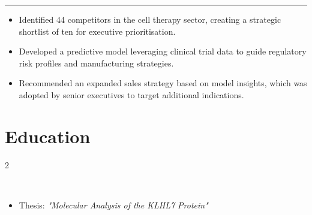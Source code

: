 \documentclass[a4paper]{deedy-resume} %
\begin{document}
\begin{center} 
    \vspace{-17pt}
     \rule{0.98\linewidth}{0.5pt} 
     \vspace{-11pt} 
\end{center} 
\begin{itemize} 
    \item Identified 44 competitors in the cell therapy sector, creating a strategic shortlist of ten for executive prioritisation. 
    \item Developed a predictive model leveraging clinical trial data to guide regulatory risk profiles and manufacturing strategies. 
    \item Recommended an expanded sales strategy based on model insights, which was adopted by senior executives to target additional indications. 
\end{itemize}
\vspace{-5pt}



\section{Education}
\vspace{-10pt}
\begin{multicols}{2}
     \\
    
    \columnbreak
    
     \\
    \vspace{-2pt}
    \begin{itemize}
        \item Thesis: \textit{"Molecular Analysis of the KLHL7 Protein"}
    \end{itemize}
\end{multicols}
\vspace{-5pt}
\end{document}
